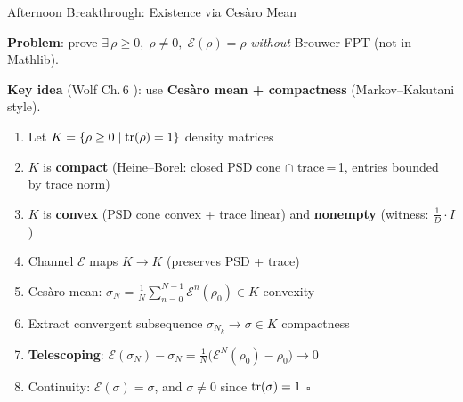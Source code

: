\documentclass[aspectratio=169,10pt]{beamer}
\begin{document}
\begin{frame}{Afternoon Breakthrough: Existence via Ces\`aro Mean}
    \vspace{-0.3em}

    \textbf{Problem}: prove $\exists\, \rho \geq 0,\; \rho \neq 0,\; \mathcal{E}(\rho) = \rho$
    \emph{without} Brouwer FPT (not in Mathlib).

    \vspace{0.3em}
    \textbf{Key idea} (Wolf Ch.\,6 \cite{Wolf2012Quantum}): use
    \textbf{Ces\`aro mean + compactness} (Markov--Kakutani style).

    \vspace{0.2em}
    \begin{enumerate}\itemsep0.15em\small
        \item Let $K = \{\rho \geq 0 \mid \mathrm{tr}(\rho) = 1\}$
            \hfill {\scriptsize\textcolor{dimwhite}{density matrices}}
        \item $K$ is \textbf{compact}
            {\scriptsize (Heine--Borel: closed PSD cone $\cap$ trace\,=\,1, entries bounded by trace norm)}
            \hfill \textcolor{leangreen}{\checkmark}
        \item $K$ is \textbf{convex} {\scriptsize (PSD cone convex + trace linear)}
            and \textbf{nonempty} {\scriptsize (witness: $\tfrac{1}{D}\cdot I$)}
            \hfill \textcolor{leangreen}{\checkmark}
        \item Channel $\mathcal{E}$ maps $K \to K$
            {\scriptsize (preserves PSD + trace)}
            \hfill \textcolor{leangreen}{\checkmark}
        \item Ces\`aro mean: $\sigma_N = \frac{1}{N}\sum_{n=0}^{N-1}\mathcal{E}^n(\rho_0) \in K$
            \hfill {\scriptsize\textcolor{dimwhite}{convexity}}
        \item Extract convergent subsequence $\sigma_{N_k} \to \sigma \in K$
            \hfill {\scriptsize\textcolor{dimwhite}{compactness}}
        \item \textbf{Telescoping}: $\mathcal{E}(\sigma_N) - \sigma_N
                = \frac{1}{N}\bigl(\mathcal{E}^N(\rho_0) - \rho_0\bigr) \to 0$
            \hfill \textcolor{leangreen}{\checkmark}
        \item Continuity: $\mathcal{E}(\sigma) = \sigma$,
            and $\sigma \neq 0$ since $\mathrm{tr}(\sigma) = 1$ \hfill $\square$
    \end{enumerate}


\end{frame}
\end{document}
